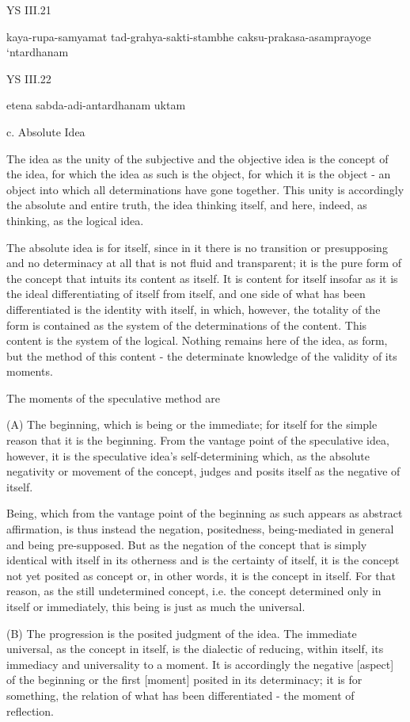 YS III.21

kaya-rupa-samyamat tad-grahya-sakti-stambhe caksu-prakasa-asamprayoge ‘ntardhanam

YS III.22

etena sabda-adi-antardhanam uktam

c. Absolute Idea

The idea as the unity of the subjective and the objective idea is
the concept of the idea, for which the idea as such is the object,
for which it is the object - an object into which all determinations have gone together.
This unity is accordingly the absolute and entire truth,
the idea thinking itself, and here, indeed, as thinking, as the logical idea.

The absolute idea is for itself, since in it there is no transition or presupposing
and no determinacy at all that is not fluid and transparent;
it is the pure form of the concept that intuits its content as itself.
It is content for itself insofar as it is the ideal differentiating of
itself from itself, and one side of what has been differentiated is
the identity with itself, in which, however, the totality of the form is
contained as the system of the determinations of the content.
This content is the system of the logical.
Nothing remains here of the idea, as form, but the method of this content -
the determinate knowledge of the validity of its moments.

The moments of the speculative method are

(A) The beginning, which is being or the immediate;
for itself for the simple reason that it is the beginning.
From the vantage point of the speculative idea, however,
it is the speculative idea's self-determining which,
as the absolute negativity or movement of the concept,
judges and posits itself as the negative of itself.

Being, which from the vantage point of the beginning as such
appears as abstract affirmation, is thus instead the negation,
positedness, being-mediated in general and being pre-supposed.
But as the negation of the concept that is simply identical
with itself in its otherness and is the certainty of itself,
it is the concept not yet posited as concept or, in other words,
it is the concept in itself.
For that reason, as the still undetermined concept,
i.e. the concept determined only in itself or immediately,
this being is just as much the universal.

(B) The progression is the posited judgment of the idea.
The immediate universal, as the concept in itself, is
the dialectic of reducing, within itself,
its immediacy and universality to a moment.
It is accordingly the negative [aspect] of the beginning or
the first [moment] posited in its determinacy;
it is for something, the relation of what has been differentiated
- the moment of reflection.

